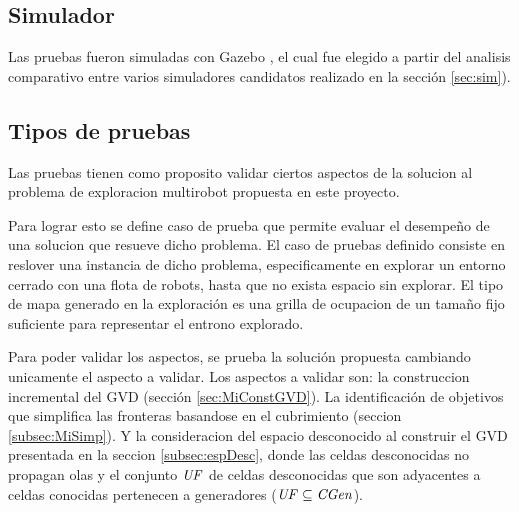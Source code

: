 
\subsection{Simulador}
Las pruebas fueron simuladas con Gazebo \cite{gazebo}, el cual fue elegido a
partir del analisis comparativo entre varios simuladores candidatos realizado
en la sección \ref{sec:sim}). 

\subsection{Tipos de pruebas}
Las pruebas tienen como proposito validar ciertos aspectos de la
solucion al problema de exploracion multirobot propuesta en este proyecto.
 
Para lograr esto se define caso de prueba que permite evaluar el desempeño de
una solucion que resueve dicho problema. El caso de pruebas definido consiste
en reslover una instancia de dicho problema, especificamente en explorar un
entorno cerrado con una flota de robots, hasta que no exista espacio sin
explorar. El tipo de mapa generado en la exploración es una grilla de ocupacion
de un tamaño fijo suficiente para representar el entrono explorado.

Para poder validar los aspectos, se prueba la solución propuesta cambiando
unicamente el aspecto a validar. Los aspectos a validar son: la construccion
incremental del GVD (sección \ref{sec:MiConstGVD}). La identificación de
objetivos que simplifica las fronteras basandose en el cubrimiento (seccion
\ref{subsec:MiSimp}). Y la consideracion del espacio desconocido al construir
el GVD presentada en la seccion \ref{subsec:espDesc}, donde las celdas
desconocidas no propagan olas y el conjunto $\mathit{UF}$ de celdas desconocidas
que son adyacentes a celdas conocidas pertenecen a generadores ($\mathit{UF}
\subseteq \mathit{CGen}$).


